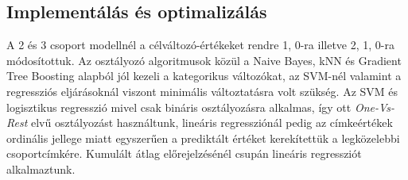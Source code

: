 \documentclass[12pt]{article}
\begin{document}
\subsection{Implementálás és optimalizálás}

A 2 és 3 csoport modellnél a célváltozó-értékeket rendre 1, 0-ra illetve 2, 1, 0-ra módosítottuk. Az osztályozó algoritmusok közül a Naive Bayes, kNN és Gradient Tree Boosting alapból jól kezeli a kategorikus változókat, az SVM-nél valamint a regressziós eljárásoknál viszont minimális változtatásra volt szükség. Az SVM és logisztikus regresszió mivel csak bináris osztályozásra alkalmas, így ott \textit{One-Vs-Rest} elvű osztályozást használtunk, lineáris regressziónál pedig az címkeértékek ordinális jellege miatt egyszerűen a prediktált értéket kerekítettük a legközelebbi csoportcímkére. Kumulált átlag előrejelzésénél csupán lineáris regressziót alkalmaztunk.
\end{document}
